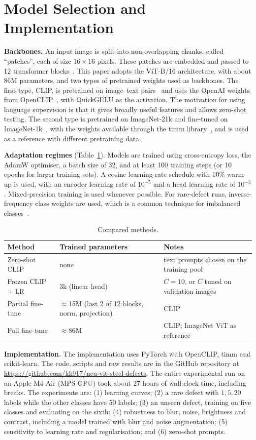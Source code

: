 \documentclass[11pt,a4paper]{article}
\begin{document}
\section{Model Selection and Implementation}
\textbf{Backbones.} An input image is split into non-overlapping chunks, called ``patches'', each of size $16\times16$ pixels. These patches are embedded and passed to 12 transformer blocks~\cite{vit}. This paper adopts the ViT-B/16 architecture, with about 86M parameters, and two types of pretrained weights used as backbones. The first type, CLIP, is pretrained on image--text pairs~\cite{clip} and uses the OpenAI weights from OpenCLIP~\cite{openclip}, with QuickGELU as the activation. The motivation for using language supervision is that it gives broadly useful features and allows zero-shot testing. The second type is pretrained on ImageNet-21k and fine-tuned on ImageNet-1k~\cite{steiner}, with the weights available through the timm library~\cite{timm}, and is used as a reference with different pretraining data.

\textbf{Adaptation regimes} (Table~\ref{tab:regimes}). Models are trained using cross-entropy loss, the AdamW optimiser, a batch size of 32, and at least 100 training steps (or 10 epochs for larger training sets). A cosine learning-rate schedule with 10\% warm-up is used, with an encoder learning rate of $10^{-5}$ and a head learning rate of $10^{-3}$. Mixed-precision training is used whenever possible. For rare-defect runs, inverse-frequency class weights are used, which is a common technique for imbalanced classes~\cite{hegarcia}.



\begin{table}[t]
\centering\small
\caption{Compared methods.}\label{tab:regimes}
\begin{tabular}{@{}lll@{}}
\toprule
Method & Trained parameters & Notes\\
\midrule
Zero-shot CLIP & none & text prompts chosen on the training pool\\
Frozen CLIP + LR & 3k (linear head) & $C=10$, or $C$ tuned on validation images\\
Partial fine-tune & $\approx$15M (last 2 of 12 blocks, norm, projection) & CLIP\\
Full fine-tune & $\approx$86M & CLIP; ImageNet ViT as reference\\
\bottomrule
\end{tabular}
\end{table}

\textbf{Implementation.} The implementation uses PyTorch with OpenCLIP, timm and scikit-learn. The code, scripts and raw results are in the GitHub repository at \url{https://github.com/kk917/neu-vit-steel-defects}. The entire experimental run on an Apple M4 Air (MPS GPU) took about 27 hours of wall-clock time, including breaks. The experiments are: (1) learning curves; (2) a rare defect with $1,5,20$ labels while the other classes have 50 labels; (3) an unseen defect, training on five classes and evaluating on the sixth; (4) robustness to blur, noise, brightness and contrast, including a model trained with blur and noise augmentation; (5) sensitivity to learning rate and regularisation; and (6) zero-shot prompts.
\end{document}
